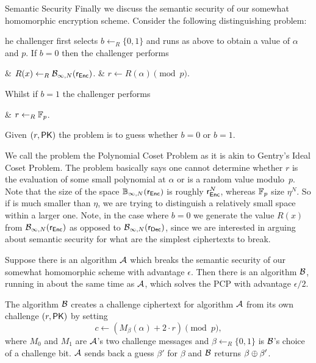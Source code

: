 \begin{bparagraph}{Semantic Security}
	Finally we discuss the semantic security of our somewhat homomorphic encryption scheme. 
	Consider the following distinguishing problem:
	\begin{definition}
		he challenger first	selects $b \leftarrow _R \{0, 1\}$ and runs {\normalfont {}} as above to obtain a value of $\alpha$ and $p$. If $b=0$ then the challenger performs
		\begin{defaultlist}
			& $R(x) \leftarrow _R \mathcal{B}_{\infty, N}({\normalfont \textsf{r}_{\textsf{Enc}}})$.
			& $r \leftarrow R(\alpha) \pmod{p}$.
		\end{defaultlist}
		\noindent
		Whilst if $b = 1$ the challenger performs
		\begin{defaultlist}
			& $r \leftarrow _R \mathbb{F}_p$.
		\end{defaultlist}
		\noindent
		Given ${\normalfont (r, \textsf{PK})}$ the problem is to guess whether $b=0$ or $b=1$.
	\end{definition}
	\noindent
	We call the problem the Polynomial Coset Problem as it is akin to Gentry's Ideal Coset Problem.
	The problem basically says one cannot determine	whether $r$ is the evaluation of some small polynomial at $\alpha$ or is a random value modulo~$p$.
	Note that the size of the space $\mathbb{B}_{\infty, N}(\textsf{r}_{\textsf{Enc}})$ is roughly $\textsf{r}_{\textsf{Enc}}^N$, whereas $\mathbb{F}_p$ size $\eta^N$. 
	So if  is much smaller than $\eta$, we are trying to distinguish a relatively small space within a larger one.
	Note, in the case where $b=0$ we generate the value $R(x)$ from $\mathcal{B}_{\infty, N}(\textsf{r}_{\textsf{Enc}})$ as opposed to $\mathcal{B}_{\infty, N}(\textsf{r}_{\textsf{Dec}})$, since we are interested in arguing about semantic security for what are the simplest ciphertexts to break.
	
	\begin{theorem}
		Suppose there is an algorithm $\mathcal{A}$ which breaks the semantic security of our somewhat homomorphic scheme with advantage $\epsilon$.
		Then there is an algorithm $\mathcal{B}$, running in about the same time as $\mathcal{A}$, which solves the PCP with advantage $\epsilon/2$.
	\end{theorem}
	
	\begin{capsproof}
		The algorithm $\mathcal{B}$ creates a challenge ciphertext for algorithm $\mathcal{A}$ from its own challenge $(r, \textsf{PK})$ by setting
		\[
		c \leftarrow (M_\beta(\alpha)+2 \cdot r) \pmod{p},
		\]
		where $M_0$ and $M_1$ are $\mathcal{A}$'s two challenge messages and $\beta \leftarrow _R \{0, 1\}$ is $\mathcal{B}$'s choice of a challenge bit. $\mathcal{A}$ sends back a guess $\beta '$ for $\beta$ and $\mathcal{B}$ returns $\beta \mathbin{\oplus} \beta '$.
		

\end{capsproof}
\end{bparagraph}

